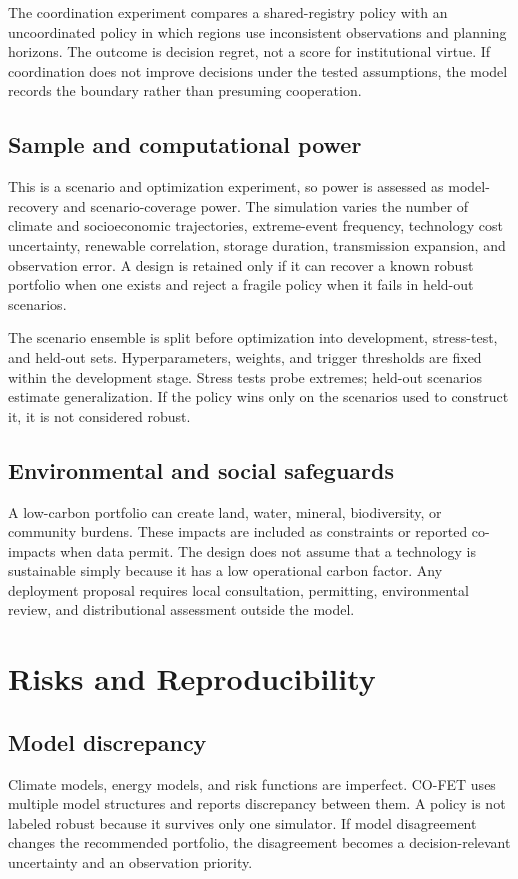 \documentclass[conference]{IEEEtran}
\begin{document}
The coordination experiment compares a shared-registry policy with an uncoordinated policy in which regions use inconsistent observations and planning horizons. The outcome is decision regret, not a score for institutional virtue. If coordination does not improve decisions under the tested assumptions, the model records the boundary rather than presuming cooperation.

\subsection{Sample and computational power}
This is a scenario and optimization experiment, so power is assessed as model-recovery and scenario-coverage power. The simulation varies the number of climate and socioeconomic trajectories, extreme-event frequency, technology cost uncertainty, renewable correlation, storage duration, transmission expansion, and observation error. A design is retained only if it can recover a known robust portfolio when one exists and reject a fragile policy when it fails in held-out scenarios.

The scenario ensemble is split before optimization into development, stress-test, and held-out sets. Hyperparameters, weights, and trigger thresholds are fixed within the development stage. Stress tests probe extremes; held-out scenarios estimate generalization. If the policy wins only on the scenarios used to construct it, it is not considered robust.

\subsection{Environmental and social safeguards}
A low-carbon portfolio can create land, water, mineral, biodiversity, or community burdens. These impacts are included as constraints or reported co-impacts when data permit. The design does not assume that a technology is sustainable simply because it has a low operational carbon factor. Any deployment proposal requires local consultation, permitting, environmental review, and distributional assessment outside the model.

\section{Risks and Reproducibility}
\subsection{Model discrepancy}
Climate models, energy models, and risk functions are imperfect. CO-FET uses multiple model structures and reports discrepancy between them. A policy is not labeled robust because it survives only one simulator. If model disagreement changes the recommended portfolio, the disagreement becomes a decision-relevant uncertainty and an observation priority.
\end{document}
